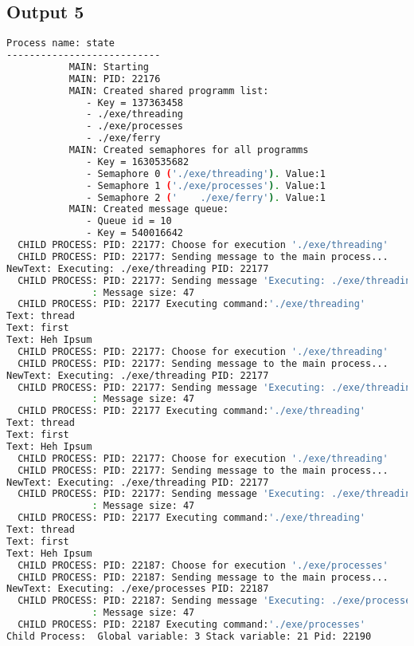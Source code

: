 \documentclass{article}
\begin{document}
\subsection{Output 5}
\begin{lstlisting}[language=BASH]
   Process name: state
---------------------------
           MAIN: Starting
           MAIN: PID: 22176
           MAIN: Created shared programm list:
              - Key = 137363458
              - ./exe/threading
              - ./exe/processes
              - ./exe/ferry
           MAIN: Created semaphores for all programms
              - Key = 1630535682
              - Semaphore 0 ('./exe/threading'). Value:1
              - Semaphore 1 ('./exe/processes'). Value:1
              - Semaphore 2 ('    ./exe/ferry'). Value:1
           MAIN: Created message queue:
              - Queue id = 10
              - Key = 540016642
  CHILD PROCESS: PID: 22177: Choose for execution './exe/threading'
  CHILD PROCESS: PID: 22177: Sending message to the main process...
NewText: Executing: ./exe/threading PID: 22177
  CHILD PROCESS: PID: 22177: Sending message 'Executing: ./exe/threading PID: 22177' to the MAIN process...
               : Message size: 47
  CHILD PROCESS: PID: 22177 Executing command:'./exe/threading'
Text: thread
Text: first
Text: Heh Ipsum
  CHILD PROCESS: PID: 22177: Choose for execution './exe/threading'
  CHILD PROCESS: PID: 22177: Sending message to the main process...
NewText: Executing: ./exe/threading PID: 22177
  CHILD PROCESS: PID: 22177: Sending message 'Executing: ./exe/threading PID: 22177' to the MAIN process...
               : Message size: 47
  CHILD PROCESS: PID: 22177 Executing command:'./exe/threading'
Text: thread
Text: first
Text: Heh Ipsum
  CHILD PROCESS: PID: 22177: Choose for execution './exe/threading'
  CHILD PROCESS: PID: 22177: Sending message to the main process...
NewText: Executing: ./exe/threading PID: 22177
  CHILD PROCESS: PID: 22177: Sending message 'Executing: ./exe/threading PID: 22177' to the MAIN process...
               : Message size: 47
  CHILD PROCESS: PID: 22177 Executing command:'./exe/threading'
Text: thread
Text: first
Text: Heh Ipsum
  CHILD PROCESS: PID: 22187: Choose for execution './exe/processes'
  CHILD PROCESS: PID: 22187: Sending message to the main process...
NewText: Executing: ./exe/processes PID: 22187
  CHILD PROCESS: PID: 22187: Sending message 'Executing: ./exe/processes PID: 22187' to the MAIN process...
               : Message size: 47
  CHILD PROCESS: PID: 22187 Executing command:'./exe/processes'
Child Process:  Global variable: 3 Stack variable: 21 Pid: 22190

\end{lstlisting}
\end{document}
